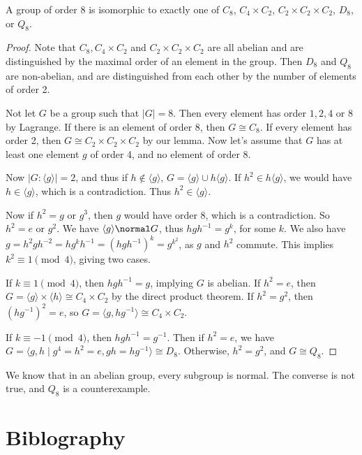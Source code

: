\documentclass[a4]{scrreprt}
\begin{document}
\begin{theorem}
	A group of order 8 is isomorphic to exactly one of $C_8$, $C_4 \times C_2$, $C_2 \times C_2 \times C_2$, $D_8$, or $Q_8$.
\end{theorem}
\begin{proof}
	Note that $C_8, C_4 \times C_2$ and $C_2 \times C_2 \times C_2$ are all abelian and are distinguished by the maximal order of an element in the group. Then $D_8$ and $Q_8$ are non-abelian, and are distinguished from each other by the number of elements of order 2.

	Not let $G$ be a group such that $|G| = 8$. Then every element has order $1, 2, 4$ or $8$ by Lagrange. If there is an element of order 8, then $G \cong C_8$. If every element has order 2, then $G \cong C_2 \times C_2 \times C_2$ by our lemma. Now let's assume that $G$ has at least one element $g$ of order 4, and no element of order 8.

	Now $|G : \langle g \rangle| = 2$, and thus if $h \not \in \langle g \rangle$, $G = \langle g \rangle \cup h \langle g \rangle$. If $h^2 \in h \langle g \rangle$, we would have $h \in \langle g \rangle$, which is a contradiction. Thus $h^2 \in \langle g \rangle$.

	Now if $h^2 = g$ or $g^3$, then $g$ would have order 8, which is a contradiction. So $h^2 = e$ or $g^2$.
	We have $\langle g \rangle \normal G$, thus $hgh^{-1} = g^k$, for some $k$. We also have $g = h^2 g h^{-2} = h g^{k} h^{-1} = (hgh^{-1})^k = g^{k^2}$, as $g$ and $h^2$ commute. 
	This implies $k^2 \equiv 1 \pmod{4}$, giving two cases.

	If $k \equiv 1 \pmod{4}$, then $hgh^{-1} = g$, implying $G$ is abelian. If $h^2 = e$, then $G = \langle g \rangle \times \langle h \rangle \cong C_4 \times C_2$ by the direct product theorem. If $h^2 = g^2$,  then $(hg^{-1})^2 = e$, so $G = \langle g, hg^{-1} \rangle \cong C_4 \times C_2$.

	If $k \equiv -1 \pmod{4}$, then $hgh^{-1} = g^{-1}$. Then if $h^2 = e$, we have $G = \langle g, h \mid g^4 = h^2 = e, gh = hg^{-1} \rangle \cong D_8$. Otherwise, $h^2 = g^2$, and $G \cong Q_8$.
\end{proof}

\begin{remark}
	We know that in an abelian group, every subgroup is normal. The converse is not true, and $Q_8$ is a counterexample.
\end{remark}

\section*{Biblography}
\end{document}
